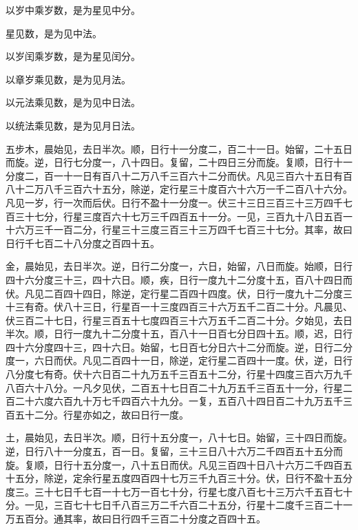 \documentclass[12pt,UTF8]{ctexbook}
\begin{document}
以岁中乘岁数，是为星见中分。



星见数，是为见中法。



以岁闰乘岁数，是为星见闰分。



以章岁乘见数，是为见月法。



以元法乘见数，是为见中日法。



以统法乘见数，是为见月日法。



五步木，晨始见，去日半次。顺，日行十一分度二，百二十一日。始留，二十五日而旋。逆，日行七分度一，八十四日。复留，二十四日三分而旋。复顺，日行十一分度二，百一十一日有百八十二万八千三百六十二分而伏。凡见三百六十五日有百八十二万八千三百六十五分，除逆，定行星三十度百六十六万一千二百八十六分。凡见一岁，行一次而后伏。日行不盈十一分度一。伏三十三日三百三十三万四千七百三十七分，行星三度百六十七万三千四百五十一分。一见，三百九十八日五百一十六万三千一百二分，行星三十三度三百三十三万四千七百三十七分。其率，故曰日行千七百二十八分度之百四十五。



金，晨始见，去日半次。逆，日行二分度一，六日，始留，八日而旋。始顺，日行四十六分度三十三，四十六日。顺，疾，日行一度九十二分度十五，百八十四日而伏。凡见二百四十四日，除逆，定行星二百四十四度。伏，日行一度九十二分度三十三有奇。伏八十三日，行星百一十三度四百三十六万五千二百二十分。凡晨见、伏三百二十七日，行星三百五十七度四百三十六万五千二百二十分。夕始见，去日半次。顺，日行一度九十二分度十五，百八十一日百七分日四十五。顺，迟，日行四十六分度四十三，四十六日。始留，七日百七分日六十二分而旋。逆，日行二分度一，六日而伏。凡见二百四十一日，除逆，定行星二百四十一度。伏，逆，日行八分度七有奇。伏十六日百二十九万五千三百五十二分，行星十四度三百六万九千八百六十八分。一凡夕见伏，二百五十七日百二十九万五千三百五十一分，行星二百二十六度六百九十万七千四百六十九分。一复，五百八十四日百二十九万五千三百五十二分。行星亦如之，故曰日行一度。



土，晨始见，去日半次。顺，日行十五分度一，八十七日。始留，三十四日而旋。逆，日行八十一分度五，百一日。复留，三十三日八十六万二千四百五十五分而旋。复顺，日行十五分度一，八十五日而伏。凡见三百四十日八十六万二千四百五十五分，除逆，定余行星五度四百四十七万三千九百三十分。伏，日行不盈十五分度三。三十七日千七百一十七万一百七十分，行星七度八百七十三万六千五百七十分。一见，三百七十七日千八百三万二千六百二十五分，行星十二度千三百二十一万五百分。通其率，故曰日行四千三百二十分度之百四十五。
\end{document}
